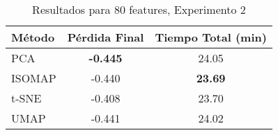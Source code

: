 
\begin{table}[h]
\centering
\begin{tabular}{lcc}
\toprule
\textbf{Método} & \textbf{Pérdida Final} & \textbf{Tiempo Total (min)} \\
\midrule
PCA & \textbf{-0.445} & 24.05 \\
ISOMAP & -0.440 & \textbf{23.69} \\
t-SNE & -0.408 & 23.70 \\
UMAP & -0.441 & 24.02 \\
\bottomrule
\end{tabular}
\caption{Resultados para 80 features, Experimento 2}
\label{tab:results_80feat_exp2}
\end{table}
